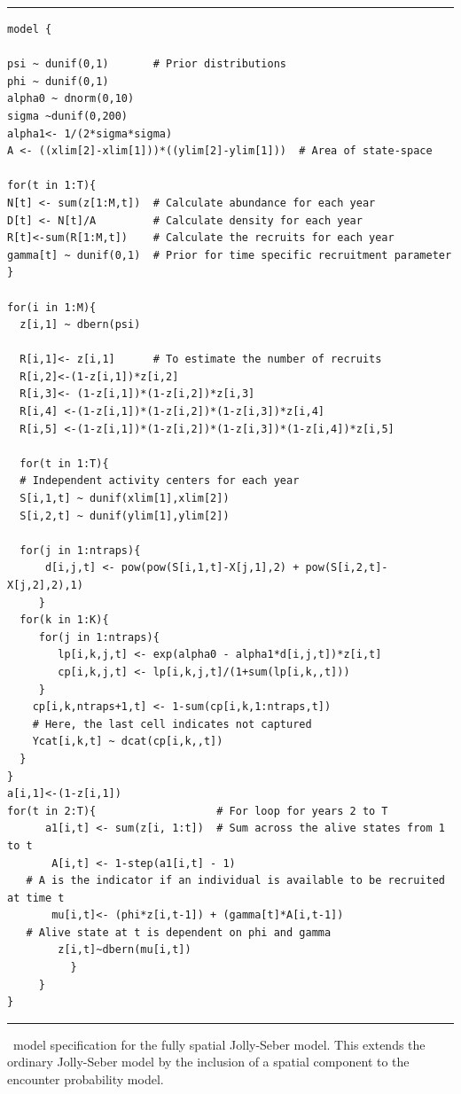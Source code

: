 \begin{panel}[htp]
\centering
\rule[0.1in]{\textwidth}{.03in}
{\small
\begin{verbatim}
model {

psi ~ dunif(0,1)       # Prior distributions
phi ~ dunif(0,1)
alpha0 ~ dnorm(0,10)
sigma ~dunif(0,200)
alpha1<- 1/(2*sigma*sigma)
A <- ((xlim[2]-xlim[1]))*((ylim[2]-ylim[1]))  # Area of state-space

for(t in 1:T){
N[t] <- sum(z[1:M,t])  # Calculate abundance for each year
D[t] <- N[t]/A	       # Calculate density for each year
R[t]<-sum(R[1:M,t])    # Calculate the recruits for each year
gamma[t] ~ dunif(0,1)  # Prior for time specific recruitment parameter
}

for(i in 1:M){
  z[i,1] ~ dbern(psi)

  R[i,1]<- z[i,1]      # To estimate the number of recruits
  R[i,2]<-(1-z[i,1])*z[i,2]
  R[i,3]<- (1-z[i,1])*(1-z[i,2])*z[i,3]
  R[i,4] <-(1-z[i,1])*(1-z[i,2])*(1-z[i,3])*z[i,4]
  R[i,5] <-(1-z[i,1])*(1-z[i,2])*(1-z[i,3])*(1-z[i,4])*z[i,5]

  for(t in 1:T){
  # Independent activity centers for each year
  S[i,1,t] ~ dunif(xlim[1],xlim[2]) 
  S[i,2,t] ~ dunif(ylim[1],ylim[2])

  for(j in 1:ntraps){
      d[i,j,t] <- pow(pow(S[i,1,t]-X[j,1],2) + pow(S[i,2,t]-X[j,2],2),1)
     }
  for(k in 1:K){
     for(j in 1:ntraps){
        lp[i,k,j,t] <- exp(alpha0 - alpha1*d[i,j,t])*z[i,t]
        cp[i,k,j,t] <- lp[i,k,j,t]/(1+sum(lp[i,k,,t]))
     }
    cp[i,k,ntraps+1,t] <- 1-sum(cp[i,k,1:ntraps,t]) 
    # Here, the last cell indicates not captured
    Ycat[i,k,t] ~ dcat(cp[i,k,,t])
  }
}
a[i,1]<-(1-z[i,1])
for(t in 2:T){                   # For loop for years 2 to T
      a1[i,t] <- sum(z[i, 1:t])  # Sum across the alive states from 1 to t
       A[i,t] <- 1-step(a1[i,t] - 1)   
   # A is the indicator if an individual is available to be recruited at time t
       mu[i,t]<- (phi*z[i,t-1]) + (gamma[t]*A[i,t-1])
   # Alive state at t is dependent on phi and gamma
        z[i,t]~dbern(mu[i,t])
          }
     }
}
\end{verbatim}
}
\rule[-0.1in]{\textwidth}{.03in}
\caption{
\jags~model specification for the fully spatial Jolly-Seber
model. This extends the ordinary Jolly-Seber model by the inclusion of
a spatial component to the encounter probability model. }
\label{open.panel.spatialJS}
\end{panel}


